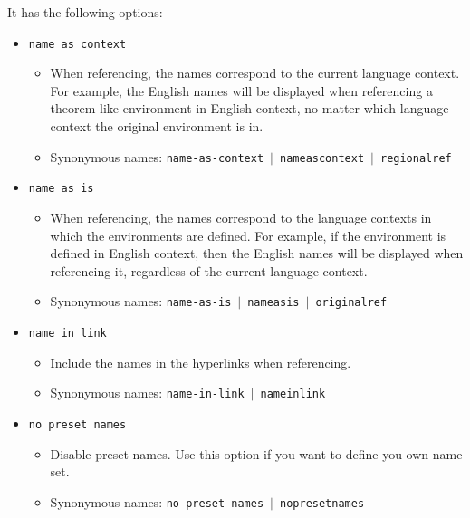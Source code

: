 \documentclass[classical]{einfart}
\newcommand{\packageoption}[1]{\texttt{\textcolor{black!67!green}{#1}}}
\begin{document}
\medskip
It has the following options:
\begin{itemize}
    \item \packageoption{name as context}
        \begin{itemize}
            \item When referencing, the names correspond to the current language context. For example, the English names will be displayed when referencing a theorem-like environment in English context, no matter which language context the original environment is in.
            \item Synonymous names: \packageoption{name-as-context} \,$|$\, \packageoption{nameascontext} \,$|$\, \packageoption{regionalref}
        \end{itemize}
    \item \packageoption{name as is}
        \begin{itemize}
            \item When referencing, the names correspond to the language contexts in which the environments are defined. For example, if the environment is defined in English context, then the English names will be displayed when referencing it, regardless of the current language context.
            \item Synonymous names: \packageoption{name-as-is} \,$|$\, \packageoption{nameasis} \,$|$\, \packageoption{originalref}
        \end{itemize}
    \item \packageoption{name in link}
        \begin{itemize}
            \item Include the names in the hyperlinks when referencing.
            \item Synonymous names: \packageoption{name-in-link} \,$|$\, \packageoption{nameinlink}
        \end{itemize}
    \item \packageoption{no preset names}
        \begin{itemize}
            \item Disable preset names. Use this option if you want to define you own name set.
            \item Synonymous names: \packageoption{no-preset-names} \,$|$\, \packageoption{nopresetnames}
        \end{itemize}
\end{itemize}
\end{document}
